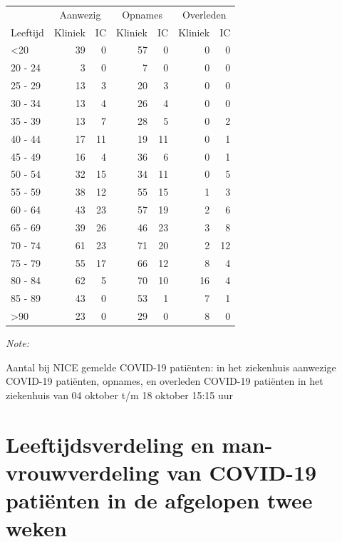 \documentclass[
  english,
  man,floatsintext]{apa6}
\begin{document}
\begin{table}
\centering\begingroup\fontsize{10}{12}\selectfont

\begin{threeparttable}
\begin{tabular}{lrrrrrr}
\toprule
\multicolumn{1}{c}{ } & \multicolumn{2}{c}{Aanwezig} & \multicolumn{2}{c}{Opnames} & \multicolumn{2}{c}{Overleden} \\
\cmidrule(l{3pt}r{3pt}){2-3} \cmidrule(l{3pt}r{3pt}){4-5} \cmidrule(l{3pt}r{3pt}){6-7}
Leeftijd & Kliniek & IC & Kliniek & IC & Kliniek & IC\\
\midrule
<20 & 39 & 0 & 57 & 0 & 0 & 0\\
20 - 24 & 3 & 0 & 7 & 0 & 0 & 0\\
25 - 29 & 13 & 3 & 20 & 3 & 0 & 0\\
30 - 34 & 13 & 4 & 26 & 4 & 0 & 0\\
35 - 39 & 13 & 7 & 28 & 5 & 0 & 2\\
40 - 44 & 17 & 11 & 19 & 11 & 0 & 1\\
45 - 49 & 16 & 4 & 36 & 6 & 0 & 1\\
50 - 54 & 32 & 15 & 34 & 11 & 0 & 5\\
55 - 59 & 38 & 12 & 55 & 15 & 1 & 3\\
60 - 64 & 43 & 23 & 57 & 19 & 2 & 6\\
65 - 69 & 39 & 26 & 46 & 23 & 3 & 8\\
70 - 74 & 61 & 23 & 71 & 20 & 2 & 12\\
75 - 79 & 55 & 17 & 66 & 12 & 8 & 4\\
80 - 84 & 62 & 5 & 70 & 10 & 16 & 4\\
85 - 89 & 43 & 0 & 53 & 1 & 7 & 1\\
>90 & 23 & 0 & 29 & 0 & 8 & 0\\
\bottomrule
\end{tabular}
\begin{tablenotes}
\item \textit{Note: } 
\item Aantal bij NICE gemelde COVID-19 patiënten: in het ziekenhuis aanwezige COVID-19 patiënten, opnames, en overleden COVID-19 patiënten in het ziekenhuis van 04 oktober t/m 18 oktober 15:15 uur
\end{tablenotes}
\end{threeparttable}
\endgroup{}
\end{table}

\newpage

\hypertarget{leeftijdsverdeling-en-man-vrouwverdeling-van-covid-19-patiuxebnten-in-de-afgelopen-twee-weken}{%
\section{Leeftijdsverdeling en man-vrouwverdeling van COVID-19 patiënten in de afgelopen twee weken}\label{leeftijdsverdeling-en-man-vrouwverdeling-van-covid-19-patiuxebnten-in-de-afgelopen-twee-weken}}
\end{document}
